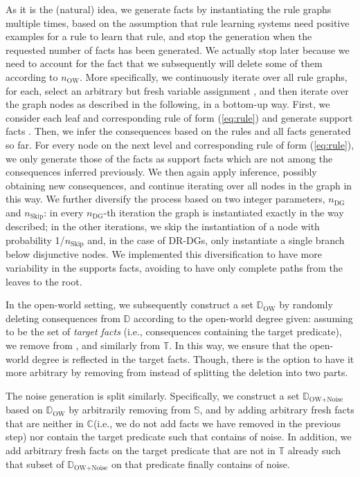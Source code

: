 \documentclass[letterpaper]{article} \usepackage{aaai20}  \usepackage{times}  \usepackage{helvet} \usepackage{courier}  \usepackage[hyphens]{url}  \usepackage{graphicx} \urlstyle{rm} \def\UrlFont{\rm}  \usepackage{graphicx}  \frenchspacing  \setlength{\pdfpagewidth}{8.5in}  \setlength{\pdfpageheight}{11in}  \usepackage{amsthm}
\theoremstyle{definition}
\newcommand{\nowa}{\ensuremath{n_{\text{OW}}}\xspace}
\newcommand{\ndag}{\ensuremath{n_{\text{DG}}}\xspace}
\newcommand{\nnskip}{\ensuremath{n_{\text{Skip}}}\xspace}
\newcommand{\db}{\ensuremath{\mathbb{D}}\xspace}\newcommand{\dbowa}{\ensuremath{\db_{\text{OW}}}\xspace}
\newcommand{\dbowan}{\ensuremath{\db_{\text{OW+Noise}}}\xspace}
\newcommand{\sfacts}{\ensuremath{\mathbb{S}}\xspace}
\newcommand{\cfacts}{\ensuremath{\mathbb{C}}\xspace}
\newcommand{\tfacts}{\ensuremath{\mathbb{T}}\xspace}
\begin{document}
As it is the (natural) idea, we generate facts by instantiating the rule graphs multiple times,
based on the assumption that rule learning systems need positive examples for a rule to learn that rule, and stop the generation when the requested number of facts has been generated. We actually stop later because we need to account for the fact that we subsequently will delete some of them according to \nowa. 
More specifically, we continuously iterate over all rule graphs, for each, select an arbitrary but fresh variable assignment , and then iterate over the graph nodes as described in the following, in a bottom-up way. 
First, we consider each leaf  and corresponding rule of form (\ref{eq:rule}) and generate support facts .
Then, we infer the consequences based on the rules and all facts generated so far. For every node  on the next level and corresponding rule of form (\ref{eq:rule}), we only generate those of the facts  as support facts which are not among the consequences inferred previously. We then again apply inference, possibly obtaining new consequences, and continue iterating over all nodes in the graph in this way.
We further diversify the process based on two integer parameters, \ndag and \nnskip: in every \ndag-th iteration the graph is instantiated exactly in the way  described; in the other iterations, we skip the instantiation of a node with probability 1/\nnskip and, in the case of DR-DGs, only instantiate a single branch below disjunctive nodes. We implemented this diversification to have more variability in the supports facts, avoiding to have only complete paths from the leaves to the root.

In the open-world setting, we subsequently construct a set \dbowa by randomly deleting consequences from \db according to the open-world degree given: 
assuming  to be the set of \emph{target facts} (i.e., consequences containing the target predicate), 
we remove  from , and similarly  from \tfacts.
In this way, we ensure that the open-world degree is reflected in the target facts. Though, there is the option to have it more arbitrary by removing  from  instead of splitting the deletion into two parts.


The noise generation is split similarly. Specifically, we construct a set \dbowan based on \dbowa by arbitrarily removing  from \sfacts, and by adding arbitrary fresh facts that are neither in \cfacts (i.e., we do not add facts we have removed in the previous step) nor contain the target predicate
such that  contains  of noise.
In addition, we add arbitrary fresh facts on the target predicate that are not in \tfacts already such that subset of \dbowan on that predicate finally contains  of noise.
\end{document}

